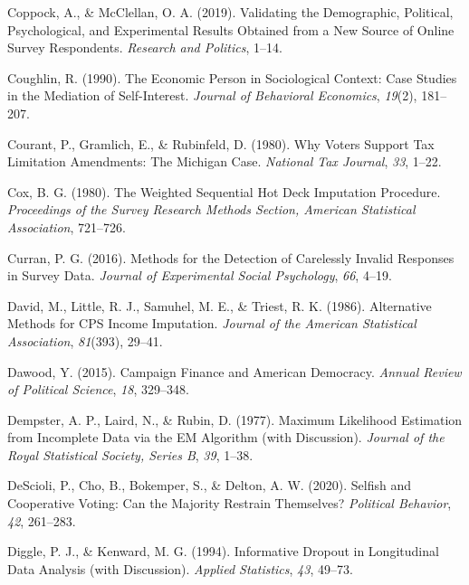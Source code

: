 \documentclass[12pt,econ]{sources/authesis}
\begin{document}
\leavevmode\hypertarget{ref-coppock_2019_validating}{}%
Coppock, A., \& McClellan, O. A. (2019). Validating the Demographic, Political, Psychological, and Experimental Results Obtained from a New Source of Online Survey Respondents. \emph{Research and Politics}, 1--14.

\leavevmode\hypertarget{ref-coughlin_economic_1990}{}%
Coughlin, R. (1990). The Economic Person in Sociological Context: Case Studies in the Mediation of Self-Interest. \emph{Journal of Behavioral Economics}, \emph{19}(2), 181--207.

\leavevmode\hypertarget{ref-courant_why_1980}{}%
Courant, P., Gramlich, E., \& Rubinfeld, D. (1980). Why Voters Support Tax Limitation Amendments: The Michigan Case. \emph{National Tax Journal}, \emph{33}, 1--22.

\leavevmode\hypertarget{ref-cox_1980_weighted}{}%
Cox, B. G. (1980). The Weighted Sequential Hot Deck Imputation Procedure. \emph{Proceedings of the Survey Research Methods Section, American Statistical Association}, 721--726.

\leavevmode\hypertarget{ref-curran_2016_methods}{}%
Curran, P. G. (2016). Methods for the Detection of Carelessly Invalid Responses in Survey Data. \emph{Journal of Experimental Social Psychology}, \emph{66}, 4--19.

\leavevmode\hypertarget{ref-david_1986_alternative}{}%
David, M., Little, R. J., Samuhel, M. E., \& Triest, R. K. (1986). Alternative Methods for CPS Income Imputation. \emph{Journal of the American Statistical Association}, \emph{81}(393), 29--41.

\leavevmode\hypertarget{ref-dawood_campaign_2015}{}%
Dawood, Y. (2015). Campaign Finance and American Democracy. \emph{Annual Review of Political Science}, \emph{18}, 329--348.

\leavevmode\hypertarget{ref-dempster_1977_maximum}{}%
Dempster, A. P., Laird, N., \& Rubin, D. (1977). Maximum Likelihood Estimation from Incomplete Data via the EM Algorithm (with Discussion). \emph{Journal of the Royal Statistical Society, Series B}, \emph{39}, 1--38.

\leavevmode\hypertarget{ref-descioli_2020_selfish}{}%
DeScioli, P., Cho, B., Bokemper, S., \& Delton, A. W. (2020). Selfish and Cooperative Voting: Can the Majority Restrain Themselves? \emph{Political Behavior}, \emph{42}, 261--283.

\leavevmode\hypertarget{ref-diggle_1994_informative}{}%
Diggle, P. J., \& Kenward, M. G. (1994). Informative Dropout in Longitudinal Data Analysis (with Discussion). \emph{Applied Statistics}, \emph{43}, 49--73.
\end{document}
